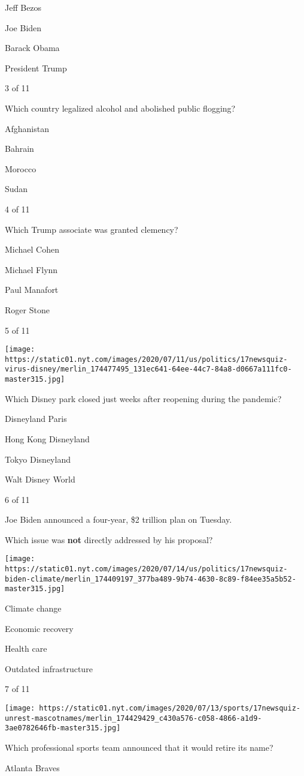 Jeff Bezos

Joe Biden

Barack Obama

President Trump

3 of 11

Which country legalized alcohol and abolished public flogging?

Afghanistan

Bahrain

Morocco

Sudan

4 of 11

Which Trump associate was granted clemency?

Michael Cohen

Michael Flynn

Paul Manafort

Roger Stone

5 of 11

\texttt{[image: https://static01.nyt.com/images/2020/07/11/us/politics/17newsquiz-virus-disney/merlin\_174477495\_131ec641-64ee-44c7-84a8-d0667a111fc0-master315.jpg]}

Which Disney park closed just weeks after reopening during the pandemic?

Disneyland Paris

Hong Kong Disneyland

Tokyo Disneyland

Walt Disney World

6 of 11

Joe Biden announced a four-year, \$2 trillion plan on Tuesday.

Which issue was \textbf{not} directly addressed by his proposal?

\texttt{[image: https://static01.nyt.com/images/2020/07/14/us/politics/17newsquiz-biden-climate/merlin\_174409197\_377ba489-9b74-4630-8c89-f84ee35a5b52-master315.jpg]}

Climate change

Economic recovery

Health care

Outdated infrastructure

7 of 11

\texttt{[image: https://static01.nyt.com/images/2020/07/13/sports/17newsquiz-unrest-mascotnames/merlin\_174429429\_c430a576-c058-4866-a1d9-3ae0782646fb-master315.jpg]}

Which professional sports team announced that it would retire its name?

Atlanta Braves

